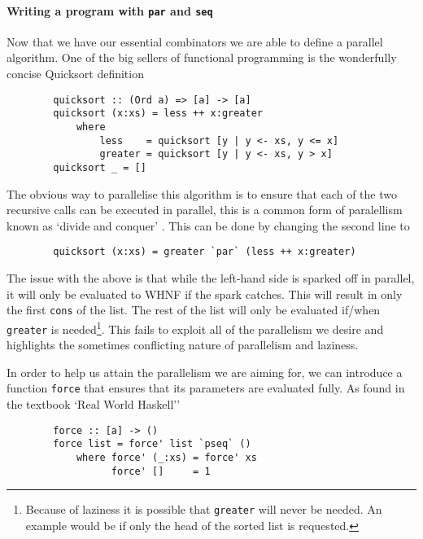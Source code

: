 \paragraph{Writing a program with \texttt{par} and \texttt{seq}}

Now that we have our essential combinators we are able to define a parallel
algorithm. One of the big sellers of functional programming is the wonderfully
concise Quicksort definition

\begin{verbatim}
        quicksort :: (Ord a) => [a] -> [a]
        quicksort (x:xs) = less ++ x:greater
            where
                less    = quicksort [y | y <- xs, y <= x]
                greater = quicksort [y | y <- xs, y > x]
        quicksort _ = []
\end{verbatim}

The obvious way to parallelise this algorithm is to ensure that each of the two
recursive calls can be executed in parallel, this is a common form of
paralellism known as `divide and conquer' . This can be done by changing the second line to

\begin{verbatim}
        quicksort (x:xs) = greater `par` (less ++ x:greater)
\end{verbatim}

The issue with the above is that while the left-hand side is sparked off in
parallel, it will only be evaluated to WHNF if the spark catches. This will
result in only the first \verb=cons= of the list. The rest of the list will
only be evaluated if/when \verb=greater= is needed\footnote{Because of
laziness it is possible that \texttt{greater} will never be needed. An
example would be if only the head of the sorted list is requested.}. This
fails to exploit all of the parallelism we desire and highlights the sometimes
conflicting nature of parallelism and laziness.

    In order to help us attain the parallelism we are aiming for, we can
introduce a function \verb=force= that ensures that its parameters are evaluated
fully. As found in the textbook `Real World Haskell'' \citep{realWorld}

\begin{verbatim}
        force :: [a] -> ()
        force list = force' list `pseq` ()
            where force' (_:xs) = force' xs
                  force' []     = 1
\end{verbatim}

